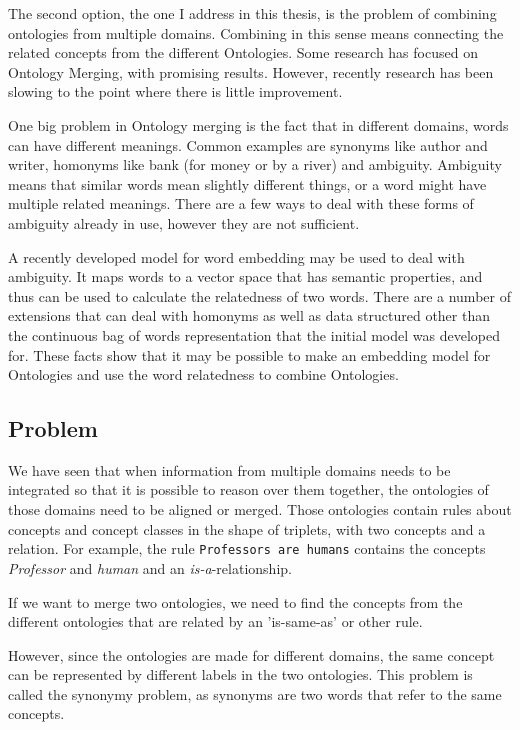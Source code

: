 \documentclass{article}
\begin{document}
 The second option, the one I address in this thesis, is the problem of combining ontologies from multiple domains. Combining in this sense means connecting the related concepts from the different Ontologies. Some research has focused on Ontology Merging, with promising results. However, recently research has been slowing to the point where there is little improvement.
 
 One big problem in Ontology merging is the fact that in different domains, words can have different meanings. Common examples are synonyms like author and writer, homonyms like bank (for money or by a river) and ambiguity. Ambiguity means that similar words mean slightly different things, or a word might have multiple related meanings. There are a few ways to deal with these forms of ambiguity already in use, however they are not sufficient.
 
 A recently developed model for word embedding may be used to deal with ambiguity. It maps words to a vector space that has semantic properties, and thus can be used to calculate the relatedness of two words. There are a number of extensions that can deal with homonyms as well as data structured other than the continuous bag of words representation that the initial model was developed for. These facts show that it may be possible to make an embedding model for Ontologies and use the word relatedness to combine Ontologies.
  
 \subsection{Problem}
 We have seen that when information from multiple domains needs to be integrated so that it is possible to reason over them together, the ontologies of those domains need to be aligned or merged. %
  Those ontologies contain rules about concepts and concept classes in the shape of triplets, with two concepts and a relation. For example, the rule {\tt Professors are humans} contains the concepts \emph{Professor} and \emph{human} and an \emph{is-a}-relationship.
 
 If we want to merge two ontologies, we need to find the concepts from the different ontologies that are related by an 'is-same-as' or other rule.
 
 However, since the ontologies are made for different domains, the same concept can be represented by different labels in the two ontologies. This problem is called the synonymy problem, as synonyms are two words that refer to the same concepts.
 
\end{document}
